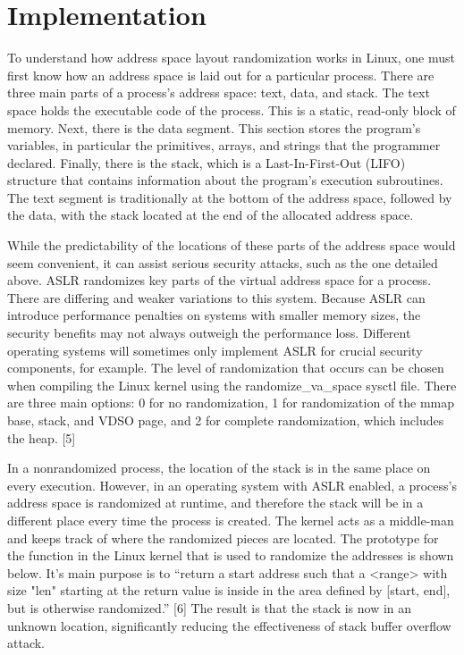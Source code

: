 \section{Implementation}
\label{s:implementation} %

To understand how address space layout randomization works in Linux, one must first know how an address space is laid out for a particular process. There are three main parts of a process’s address space: text, data, and stack. The text space holds the executable code of the process. This is a static, read-only block of memory. Next, there is the data segment. This section stores the program’s variables, in particular the primitives, arrays, and strings that the programmer declared. Finally, there is the stack, which is a Last-In-First-Out (LIFO) structure that contains information about the program’s execution subroutines. The text segment is traditionally at the bottom of the address space, followed by the data, with the stack located at the end of the allocated address space.

While the predictability of the locations of these parts of the address space would seem convenient, it can assist serious security attacks, such as the one detailed above. ASLR randomizes key parts of the virtual address space for a process. There are differing and weaker variations to this system. Because ASLR can introduce performance penalties on systems with smaller memory sizes, the security benefits may not always outweigh the performance loss. Different operating systems will sometimes only implement ASLR for crucial security components, for example. The level of randomization that occurs can be chosen when compiling the Linux kernel using the randomize_va_space sysctl file. There are three main options: 0 for no randomization, 1 for randomization of the mmap base, stack, and VDSO page, and 2 for complete randomization, which includes the heap. [5]

In a nonrandomized process, the location of the stack is in the same place on every execution. However, in an operating system with ASLR enabled, a process’s address space is randomized at runtime, and therefore the stack will be in a different place every time the process is created. The kernel acts as a middle-man and keeps track of where the randomized pieces are located. The prototype for the function in the Linux kernel that is used to randomize the addresses is shown below. It’s main purpose is to “return a start address such that a <range> with size "len" starting at the return value is inside in the area defined by [start, end], but is otherwise randomized.” [6] The result is that the stack is now in an unknown location, significantly reducing the effectiveness of stack buffer overflow attack.

